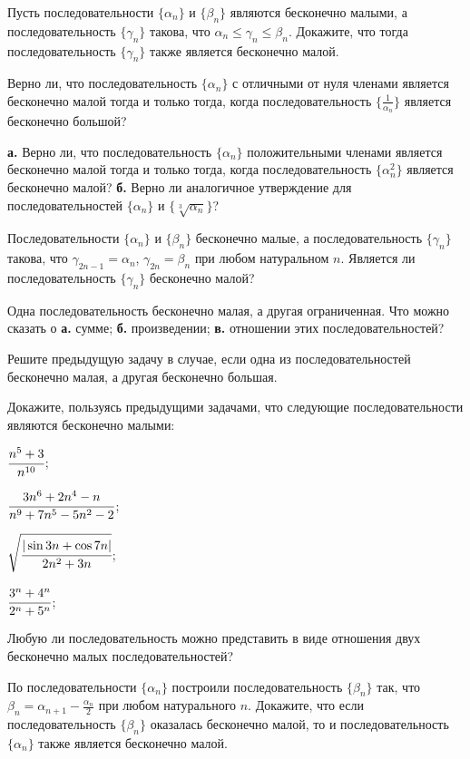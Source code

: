 \documentclass[a4paper, 12pt, num=25]{listok}
\begin{document}
\begin{problem}
	Пусть последовательности $\{\alpha_n\}$ и $\{\beta_n\}$ являются бесконечно малыми,
	а последовательность $\{\gamma_n\}$ такова, что $\alpha_n \le \gamma_n \le \beta_n$.
	Докажите, что тогда последовательность $\{\gamma_n\}$ также является бесконечно малой.
\end{problem}
\begin{problem}
	Верно ли, что последовательность $\{\alpha_n\}$ с отличными от нуля членами является бесконечно малой тогда и только тогда,
	когда последовательность $\{\frac1{\alpha_n}\}$ является бесконечно большой?
\end{problem}
\begin{problem}
	\textbf{а.} Верно ли, что последовательность $\{\alpha_n\}$ положительными членами является бесконечно малой тогда и только тогда,
	когда последовательность $\{\alpha_n^2\}$ является бесконечно малой?
	\textbf{б.} Верно ли аналогичное утверждение для последовательностей $\{\alpha_n\}$ и $\{\sqrt[3]{\alpha_n}\}$?
\end{problem}
\begin{problem}
	Последовательности $\{\alpha_n\}$ и $\{\beta_n\}$ бесконечно малые, а последовательность $\{\gamma_n\}$ такова,
	что $\gamma_{2n-1} = \alpha_n$, $\gamma_{2n} = \beta_n$ при любом натуральном $n$.
	Является ли последовательность $\{\gamma_n\}$ бесконечно малой?
\end{problem}
\begin{problem}
	Одна последовательность бесконечно малая, а другая ограниченная.
	Что можно сказать о \textbf{а.} сумме; \textbf{б.} произведении; \textbf{в.} отношении этих последовательностей?
\end{problem}
\begin{problem}
	Решите предыдущую задачу в случае, если одна из последовательностей бесконечно малая, а другая бесконечно большая.
\end{problem}
\begin{problem}
	Докажите, пользуясь предыдущими задачами, что следующие последовательности являются бесконечно малыми:
	\begin{multienum}{4}
		\item $\cfrac{n^5 + 3}{n^{10}}$;
		\item $\cfrac{3n^6 + 2n^4 - n}{n^9 + 7n^5 - 5n^2 - 2}$;
		\item $\sqrt{\cfrac{|\sin{3n} + \cos{7n}|}{2n^2 + 3n}}$;
		\item $\cfrac{3^n + 4^n}{2^n + 5^n}$;
	\end{multienum}
\end{problem}
\begin{problem}
	Любую ли последовательность можно представить в виде отношения двух бесконечно малых последовательностей?
\end{problem}
\begin{problem}
	По последовательности $\{\alpha_n\}$ построили последовательность $\{\beta_n\}$ так, что 
	$\beta_n = \alpha_{n + 1} - \frac{\alpha_n}2$ при любом натурального $n$.
	Докажите, что если последовательность $\{\beta_n\}$ оказалась бесконечно малой,
	то и последовательность $\{\alpha_n\}$ также является бесконечно малой.
\end{problem}
\end{document}
